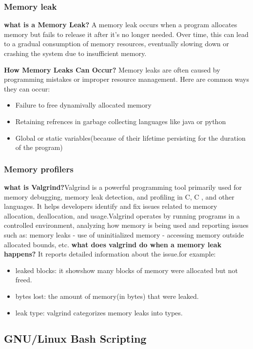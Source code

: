 \documentclass[12pt, letterpaper]{article}
\begin{document}
\begin{enumerate}
\subsubsection{Memory leak}
\textbf{what is a Memory Leak?} A memory leak occurs when a program allocates memory but fails to release it after it's no longer needed. Over time, this can lead to a gradual consumption of memory resources, eventually slowing down or crashing the system due to insufficient memory.

\textbf{How Memory Leaks Can Occur?} Memory leaks are often caused by programming mistakes or improper resource management. Here are common ways they can occur:

\begin{itemize}
    \item Failure to free dynamivally allocated memory
    \item Retaining refrences in garbage collecting languages like java or python
    \item Global or static variables(because of their lifetime persisting for the duration of the program)
\end{itemize}
\subsubsection{Memory profilers}
\textbf{what is Valgrind?}Valgrind is a powerful programming tool primarily used for memory debugging, memory leak detection, and profiling in C, C , and other languages. It helps developers identify and fix issues related to memory allocation, deallocation, and usage.Valgrind operates by running programs in a controlled environment, analyzing how memory is being used and reporting issues such as:
memory leaks - use of uninitialized memory - accessing memory outside allocated bounds, etc.
\textbf{what does valgrind do when a memory leak happens?} It reports detailed information about the issue.for example:
\begin{itemize}
    \item leaked blocks: it showshow many blocks of memory were allocated but not freed.
    \item bytes lost: the amount of memory(in bytes) that were leaked.
    \item leak type: valgrind categorizes memory leaks into types.
\end{itemize}
\subsection{GNU/Linux Bash Scripting}

\end{enumerate}
\end{document}

